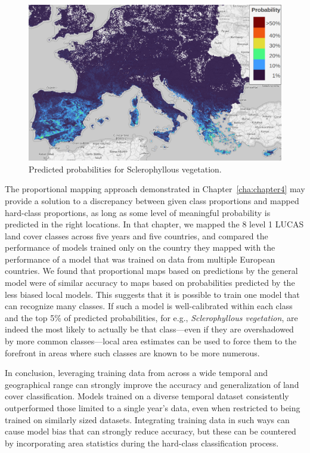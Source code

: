         \begin{figure}[H]
        \centering
        \includegraphics[width=1\linewidth]{figs_06/sclerophyllous.png}
        \caption{Predicted probabilities for Sclerophyllous vegetation.}
        \label{fig:sclerophyllous}
        \end{figure}
        
        The proportional mapping approach demonstrated in Chapter\@~\ref{cha:chapter4} may provide a solution to a discrepancy between given class proportions and mapped hard-class proportions, as long as some level of meaningful probability is predicted in the right locations. In that chapter, we mapped the 8 level 1 LUCAS land cover classes across five years and five countries, and compared the performance of models trained only on the country they mapped with the performance of a model that was trained on data from multiple European countries. We found that proportional maps based on predictions by the general model were of similar accuracy to maps based on probabilities predicted by the less biased local models. This suggests that it is possible to train one model that can recognize many classes. If such a model is well-calibrated within each class and the top 5\% of predicted probabilities, for e.g., \textit{Sclerophyllous vegetation}, are indeed the most likely to actually be that class---even if they are overshadowed by more common classes---local area estimates can be used to force them to the forefront in areas where such classes are known to be more numerous. 

        In conclusion, leveraging training data from across a wide temporal and geographical range can strongly improve the accuracy and generalization of land cover classification. Models trained on a diverse temporal dataset consistently outperformed those limited to a single year's data, even when restricted to being trained on similarly sized datasets. Integrating training data in such ways can cause model bias that can strongly reduce accuracy, but these can be countered by incorporating area statistics during the hard-class classification process.
        
